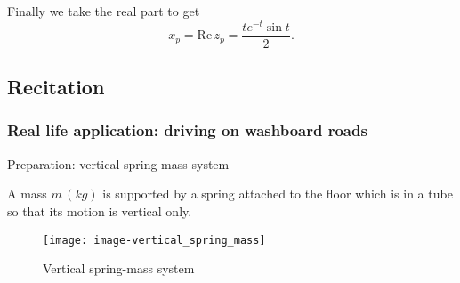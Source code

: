 Finally we take the real part to get
\begin{equation*}
  x_ p = \mathrm{Re\, }z_ p = \frac{te^{-t}\sin t}{2}.
\end{equation*}
\clearpage

\subsection{Recitation}

\subsubsection{Real life application: driving on washboard roads}

\begin{problem}
  Preparation: vertical spring-mass system
\end{problem}

A mass $m\,(kg)$ is supported by a spring attached to the floor
which is in a tube so that its motion is vertical only.

\begin{figure}[ht!]
  \centering
  \texttt{[image: image-vertical\_spring\_mass]}
  \caption{Vertical spring-mass system}
\end{figure}

